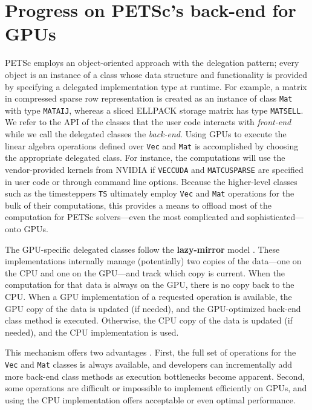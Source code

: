 \documentclass[10pt,journal,compsoc]{IEEEtran}
\begin{document}
\section{Progress on PETSc's back-end for GPUs}


PETSc employs an object-oriented approach with the delegation pattern; every
object is an instance of a class whose data structure and functionality is
provided by specifying a delegated implementation type at runtime. For example,
a matrix in compressed sparse row representation is created as an instance
of class {\tt Mat} with type {\tt MATAIJ}, whereas a sliced ELLPACK storage
matrix has type {\tt MATSELL}.
We refer
to the API of the classes that the user code interacts with {\it front-end} while we call the delegated
classes the {\it back-end}.
Using GPUs to execute the linear algebra operations defined over {\tt Vec} and
{\tt Mat} is accomplished by choosing the appropriate delegated class. For
instance,  the computations will use the vendor-provided kernels
from NVIDIA if {\tt VECCUDA} and {\tt MATCUSPARSE} are
specified in user code or through command line
options. 
Because the higher-level classes such as the timesteppers {\tt TS} ultimately employ {\tt Vec}
and {\tt Mat} operations for the bulk of their computations, this provides a
means to offload most of the computation for PETSc solvers---even the most
complicated and sophisticated---onto GPUs.

The GPU-specific delegated classes follow the {\bf lazy-mirror} model
\cite{petsc-msk2013}. These implementations internally manage (potentially) two
copies of the data---one on the CPU and one on the GPU---and track which copy is current. When the computation for that data is always on the GPU, there is no
copy back to the CPU. When a GPU implementation of a requested operation
is available, the GPU copy of the data is updated (if needed), and the
GPU-optimized back-end class method is executed. Otherwise, the CPU copy of the data is updated (if
needed), and the CPU implementation is used.

This mechanism offers two advantages \cite{Karl2020preparing}.  First, the full set of
operations for the {\tt Vec} and {\tt Mat} classes is always available, and
developers can incrementally add more back-end class methods as execution
bottlenecks become apparent. Second, some operations are difficult or impossible
to implement efficiently on GPUs, and using the CPU implementation offers
acceptable or even optimal performance.
\end{document}
